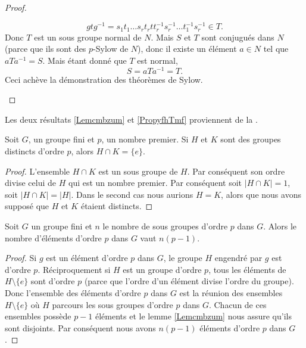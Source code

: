 \begin{proof}
\begin{enumerate}
            \begin{equation}
                gtg^{-1}=s_1t_1\ldots s_rt_rtt_r^{-1}s_r^{-1}\ldots t_1^{-1}s_r^{-1}\in T.
            \end{equation}
            Donc \( T\) est un sous groupe normal de \( N\). Mais \( S\) et \( T\) sont conjugués dans \( N\) (parce que ils sont des $p$-Sylow de \( N\)), donc il existe un élément \( a\in N\) tel que \( aTa^{-1}=S\). Mais étant donné que \( T\) est normal,
            \begin{equation}
                S=aTa^{-1}=T.
            \end{equation}
            Ceci achève la démonstration des théorèmes de Sylow.

    \end{enumerate}
\end{proof}

Les deux résultats \ref{Lemcmbzum} et \ref{PropyfhTmf} proviennent de la .

\begin{lemma}\label{Lemcmbzum}
    Soit \( G\), un groupe fini et \( p\), un nombre premier. Si \( H\) et \( K\) sont des groupes distincts d'ordre \( p\), alors \( H\cap K=\{ e \}\).
\end{lemma}

\begin{proof}
    L'ensemble \( H\cap K\) est un sous groupe de \( H\). Par conséquent son ordre divise celui de \( H\) qui est un nombre premier. Par conséquent soit \( | H\cap K |=1\), soit \( | H\cap K |=| H |\). Dans le second cas nous aurions \( H=K\), alors que nous avons supposé que \( H\) et \( K\) étaient distincts.
\end{proof}


\begin{proposition} \label{PropyfhTmf}
    Soit \( G\) un groupe fini et \( n\) le nombre de sous groupes d'ordre \( p\) dans \( G\). Alors le nombre d'éléments d'ordre \( p\) dans \( G\) vaut \( n(p-1)\).
\end{proposition}

\begin{proof}
    Si \( g\) est un élément d'ordre \( p\) dans \( G\), le groupe \( H\) engendré par \( g\) est d'ordre \( p\). Réciproquement si \( H\) est un groupe d'ordre \( p\), tous les éléments de \( H\setminus\{ e \}\) sont d'ordre \( p\) (parce que l'ordre d'un élément divise l'ordre du groupe). Donc l'ensemble des éléments d'ordre \( p\) dans \( G\) est la réunion des ensembles \( H\setminus\{ e \}\) où \( H\) parcours les sous groupes d'ordre \( p\) dans \( G\). Chacun de ces ensembles possède \( p-1\) éléments et le lemme \ref{Lemcmbzum} nous assure qu'ils sont disjoints. Par conséquent nous avons \( n(p-1)\) éléments d'ordre \( p\) dans \( G\).
\end{proof}

